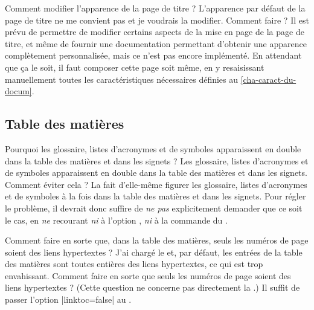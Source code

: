 \begin{dbfaq}{Comment modifier l'apparence de la page de titre ?}{}
  L'apparence par défaut de la page de titre ne me convient pas et je voudrais
  la modifier. Comment faire ?
  \tcblower
  Il est prévu de permettre de modifier certains aspects de la mise en page de
  la page de titre, et même de fournir une documentation permettant d'obtenir
  une apparence complètement personnalisée, mais ce n'est pas encore
  implémenté.  En attendant que ça le soit, il faut composer cette page soit
  même, en y resaisissant manuellement toutes les caractéristiques nécessaires
  définies au \vref{cha-caract-du-docum}.
\end{dbfaq}

\subsection{Table des matières}
\label{sec-table-des-matieres-faq}

\begin{dbfaq}{Pourquoi les glossaire, listes d'acronymes et de symboles
    apparaissent en double dans la table des matières et dans les signets ?}{}
  Les glossaire, listes d'acronymes et de symboles apparaissent en double dans
  la table des matières et dans les signets. Comment éviter cela ?%
  \tcblower
  La \yatCl{} fait d'elle-même figurer les glossaire, listes d'acronymes et de
  symboles à la fois dans la table des matières et dans les signets. Pour
  régler le problème, il devrait donc suffire de \emph{ne pas} explicitement
  demander que ce soit le cas, en \emph{ne} recourant \emph{ni} à l'option
  , \emph{ni} à la commande  du
  .
\end{dbfaq}

\begin{dbfaq}{Comment faire en sorte que, dans la table des matières, seuls
    les numéros de page soient des liens hypertextes ?}{}
  J'ai chargé le  et, par défaut, les entrées de la table des
  matières sont toutes entières des liens hypertextes, ce qui est trop
  envahissant. Comment faire en sorte que seuls les numéros de page soient des
  liens hypertextes ?
  \tcblower
  (Cette question ne concerne pas directement la \yatCl{}.) Il suffit de passer
  l'option |linktoc=false| au .
\end{dbfaq}


